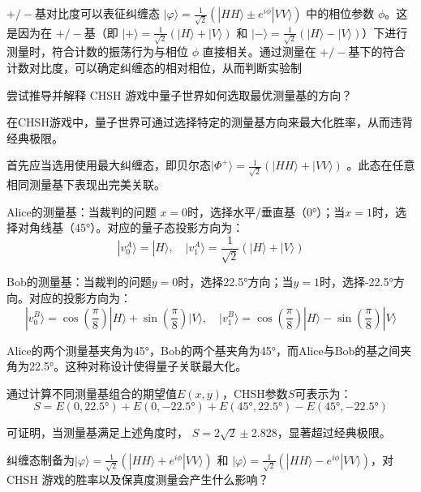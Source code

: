 \(+/-\)基对比度可以表征纠缠态 \(|\varphi \rangle = \frac{1}{\sqrt{2}}(|HH \rangle \pm e^{i \phi}|VV \rangle)\) 中的相位参数 \(\phi\)。这是因为在 \(+/-\)基（即 \(|+\rangle = \frac{1}{\sqrt{2}}(|H\rangle + |V\rangle)\) 和 \(|-\rangle = \frac{1}{\sqrt{2}}(|H\rangle - |V\rangle)\)）下进行测量时，符合计数的振荡行为与相位 \(\phi\) 直接相关。通过测量在 \(+/-\)基下的符合计数对比度，可以确定纠缠态的相对相位，从而判断实验制

\begin{question}
	尝试推导并解释 CHSH 游戏中量子世界如何选取最优测量基的方向？
\end{question}

在CHSH游戏中，量子世界可通过选择特定的测量基方向来最大化胜率，从而违背经典极限。

首先应当选用使用最大纠缠态，即贝尔态$|\Phi^+ \rangle = \frac{1}{\sqrt{2}}(|HH \rangle + |VV \rangle)$ 。此态在任意相同测量基下表现出完美关联。

Alice的测量基：当裁判的问题 $x=0$时，选择水平/垂直基（0°）；当$x=1$时，选择对角线基（45°）。对应的量子态投影方向为：
\[
|v_0^A \rangle = |H \rangle , \quad |v_1^A \rangle = \frac{1}{\sqrt{2}} (|H \rangle + |V \rangle)
\]

Bob的测量基：当裁判的问题$y=0$时，选择22.5°方向；当$y=1$时，选择-22.5°方向。对应的投影方向为：
\[
|v_0^B \rangle = \cos(\frac{\pi}{8}) |H \rangle + \sin(\frac{\pi}{8}) |V \rangle , \quad |v_1^B \rangle = \cos(\frac{\pi}{8}) |H \rangle - \sin(\frac{\pi}{8}) |V \rangle
\]

Alice的两个测量基夹角为45°，Bob的两个基夹角为45°，而Alice与Bob的基之间夹角为22.5°。这种对称设计使得量子关联最大化。

通过计算不同测量基组合的期望值$E(x,y)$，CHSH参数$S$可表示为：
\[
S = E(0, 22.5°) + E(0, -22.5°) + E(45°, 22.5°) - E(45°, -22.5°)
\]

可证明，当测量基满足上述角度时， $S = 2\sqrt{2} \pm $2.828，显著超过经典极限。

\begin{question}
	纠缠态制备为$|\varphi \rangle = \frac{1}{\sqrt{2}}(|HH \rangle + e^{i \phi}|VV \rangle)$ 和 $|\varphi \rangle = \frac{1}{\sqrt{2}}(|HH \rangle - e^{i \phi}|VV \rangle)$，对 CHSH 游戏的胜率以及保真度测量会产生什么影响？
\end{question}

